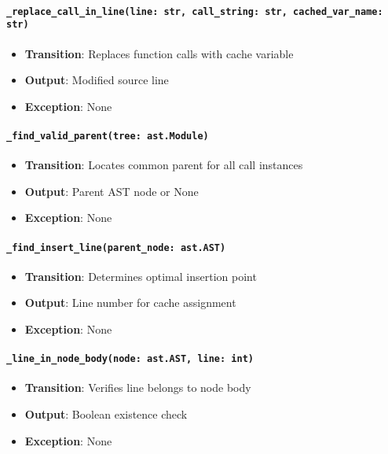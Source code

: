 \documentclass[12pt, titlepage]{article}
\begin{document}
\paragraph{\texttt{\_replace\_call\_in\_line(line: str, call\_string: str, cached\_var\_name: str)}}
\begin{itemize}
  \item \textbf{Transition}: Replaces function calls with cache variable
  \item \textbf{Output}: Modified source line
  \item \textbf{Exception}: None
\end{itemize}

\paragraph{\texttt{\_find\_valid\_parent(tree: ast.Module)}}
\begin{itemize}
  \item \textbf{Transition}: Locates common parent for all call instances
  \item \textbf{Output}: Parent AST node or None
  \item \textbf{Exception}: None
\end{itemize}

\paragraph{\texttt{\_find\_insert\_line(parent\_node: ast.AST)}}
\begin{itemize}
  \item \textbf{Transition}: Determines optimal insertion point
  \item \textbf{Output}: Line number for cache assignment
  \item \textbf{Exception}: None
\end{itemize}

\paragraph{\texttt{\_line\_in\_node\_body(node: ast.AST, line: int)}}
\begin{itemize}
  \item \textbf{Transition}: Verifies line belongs to node body
  \item \textbf{Output}: Boolean existence check
  \item \textbf{Exception}: None
\end{itemize}
\end{document}
